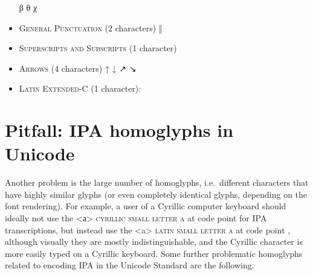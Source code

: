 \begin{itemize}[itemsep=4pt]
	β θ χ
    \item \textsc{General Punctuation} (2 characters) \newline 
    ‖ 
	\item \textsc{Superscripts and Subscripts} (1 character) \newline
	\item \textsc{Arrows} (4 characters) \newline 
	↑ ↓ ↗ ↘
	\item \textsc{Latin Extended-C} (1 character): \newline
\end{itemize}

\section{Pitfall: IPA homoglyphs in Unicode}
\label{pitfall-ipa-homoglyphs}

Another problem is the large number of homoglyphs, i.e.~different characters
that have highly similar glyphs (or even completely identical glyphs, depending
on the font rendering). For example, a user of a Cyrillic computer keyboard
should ideally not use the <а> \textsc{cyrillic small letter a} at code point
 for IPA transcriptions, but instead use the <a> \textsc{latin small
letter a} at code point , although visually they are mostly
indistinguishable, and the Cyrillic character is more easily typed on a Cyrillic
keyboard. Some further problematic homoglyphs related to encoding IPA in the
Unicode Standard are the following.

